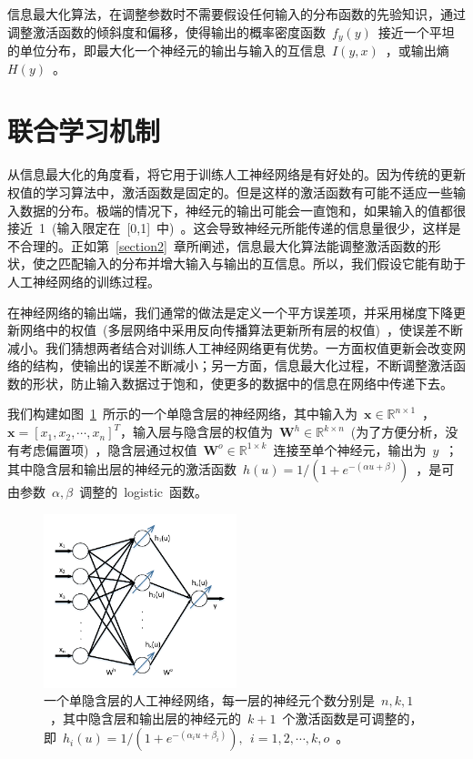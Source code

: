 \documentclass[UTF8,a4paper,12pt]{ctexart}
\numberwithin{equation}{section}
\numberwithin{figure}{section}
\numberwithin{table}{section}
\begin{document}
信息最大化算法，在调整参数时不需要假设任何输入的分布函数的先验知识，通过调整激活函数的倾斜度和偏移，使得输出的概率密度函数~$f_y(y)$~接近一个平坦的单位分布，即最大化一个神经元的输出与输入的互信息~$I(y,x)$~，或输出熵~$H(y)$~。

\section{联合学习机制}
从信息最大化的角度看，将它用于训练人工神经网络是有好处的。因为传统的更新权值的学习算法中，激活函数是固定的。但是这样的激活函数有可能不适应一些输入数据的分布。极端的情况下，神经元的输出可能会一直饱和，如果输入的值都很接近~1~(输入限定在~[0,1]~中)~。这会导致神经元所能传递的信息量很少，这样是不合理的。正如第~\ref{section2}~章所阐述，信息最大化算法能调整激活函数的形状，使之匹配输入的分布并增大输入与输出的互信息。所以，我们假设它能有助于人工神经网络的训练过程。

在神经网络的输出端，我们通常的做法是定义一个平方误差项，并采用梯度下降更新网络中的权值~(多层网络中采用反向传播算法更新所有层的权值)~，使误差不断减小。我们猜想两者结合对训练人工神经网络更有优势。一方面权值更新会改变网络的结构，使输出的误差不断减小；另一方面，信息最大化过程，不断调整激活函数的形状，防止输入数据过于饱和，使更多的数据中的信息在网络中传递下去。

我们构建如图~\ref{fig:fnn}~所示的一个单隐含层的神经网络，其中输入为~$\bm{x} \in \mathbb{R}^{n \times 1}$~，$\bm{x}=[x_1,x_2,\cdots,x_n]^T$，输入层与隐含层的权值为~$\bm{W}^h \in \mathbb{R}^{k \times n}$~(为了方便分析，没有考虑偏置项)~，隐含层通过权值~$\bm{W}^o \in \mathbb{R}^{1 \times k}$~连接至单个神经元，输出为~$y$~；其中隐含层和输出层的神经元的激活函数~$h(u) = 1 / (1 + e ^{-(\alpha u+\beta)})$~，是可由参数~$\alpha,\beta$~调整的~logistic~函数。
\begin{figure}[htbp]
	\centering
	\includegraphics[width=0.5\textwidth]{fnn.pdf}
	\caption{一个单隐含层的人工神经网络，每一层的神经元个数分别是~$n,k,1$~，其中隐含层和输出层的神经元的~$k+1$~个激活函数是可调整的，即~$h_i(u) = 1 / (1 + e ^{-(\alpha_i u+\beta_i)}),~~i=1,2,\cdots,k,o$~。} \label{fig:fnn}
\end{figure}
\end{document}
